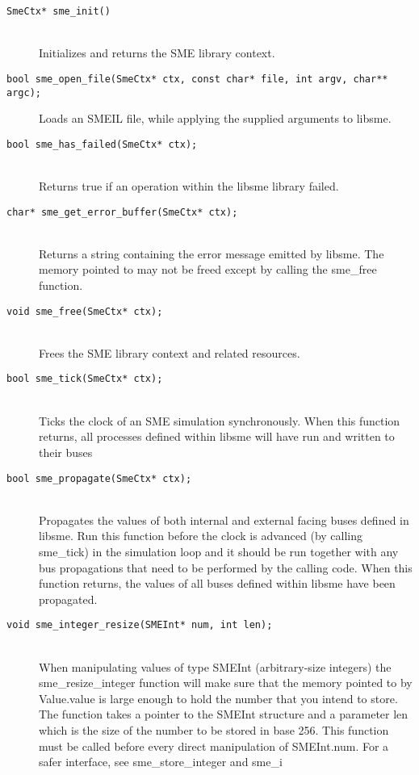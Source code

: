 \begin{description}
\item[\texttt{SmeCtx* sme\_init()}]\hfill\\
   Initializes and returns the SME library context.
\item[\texttt{bool sme_open_file(SmeCtx* ctx, const char* file, int argv, char**
    argc);}]\hfill
     Loads an SMEIL file, while applying the supplied arguments to libsme.
\item[\texttt{bool sme_has_failed(SmeCtx* ctx);}]\hfill\\
   Returns true if an operation within the libsme library failed.
 \item[\texttt{char* sme_get_error_buffer(SmeCtx* ctx);}]\hfill\\
   Returns a string containing the error message emitted by libsme. The memory
   pointed to may not be freed except by calling the sme_free function.
 \item[\texttt{void sme_free(SmeCtx* ctx);}]\hfill\\
   Frees the SME library context and related resources.
 \item[\texttt{bool sme_tick(SmeCtx* ctx);}]\hfill\\
   Ticks the clock of an SME simulation synchronously. When this function
   returns, all processes defined within libsme will have run and written to
   their buses
 \item[\texttt{bool sme_propagate(SmeCtx* ctx);}]\hfill\\
   Propagates the values of both internal and external facing buses defined in
   libsme. Run this function before the clock is advanced (by calling sme_tick)
   in the simulation loop and it should be run together with any bus
   propagations that need to be performed by the calling code. When this
   function returns, the values of all buses defined within libsme have been
   propagated.
 \item[\texttt{void sme_integer_resize(SMEInt* num, int len);}]\hfill\\
   When manipulating values of type SMEInt (arbitrary-size integers) the
   sme_resize_integer function will make sure that the memory pointed to by
   Value.value is large enough to hold the number that you intend to store. The
   function takes a pointer to the SMEInt structure and a parameter len which is
   the size of the number to be stored in base 256. This function must be called
   before every direct manipulation of SMEInt.num. For a safer interface, see
   sme_store_integer and sme_i

\end{description}
